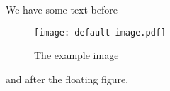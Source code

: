 We have some text before
\begin{figure}[b]
	\centering\texttt{[image: default-image.pdf]}
	\caption{The example image}
\end{figure}
and after the floating figure.
